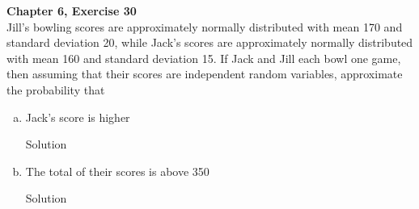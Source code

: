 \documentclass{article}
\begin{document}
\begin{spacing}{1.1}
\newpage
\begin{homeworkProblem}
  {\bf Chapter 6, Exercise 30}\\
  Jill's bowling scores are approximately normally distributed with 
  mean 170 and standard deviation 20, while Jack's scores are 
  approximately normally distributed with mean 160 and standard 
  deviation 15. If Jack and Jill each bowl one game, then assuming 
  that their scores are independent random variables, approximate 
  the probability that
  \begin{enumerate}[(a)]
    \item Jack's score is higher
      \begin{homeworkSection}{Solution}
        
      \end{homeworkSection}
    \item The total of their scores is above 350
      \begin{homeworkSection}{Solution}
        
      \end{homeworkSection}
  \end{enumerate}
\end{homeworkProblem}

\end{spacing}
\end{document}
